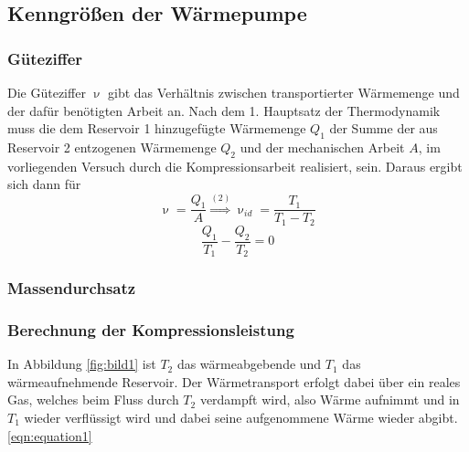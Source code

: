 \subsection{Kenngrößen der Wärmepumpe}
\subsubsection {Güteziffer}
\label{sec:güteziffer}
Die Güteziffer $\upnu$ gibt das Verhältnis zwischen transportierter Wärmemenge und der dafür benötigten Arbeit an. Nach dem 1. Hauptsatz der Thermodynamik muss die dem Reservoir 1 hinzugefügte Wärmemenge $Q_1$
der Summe der aus Reservoir 2 entzogenen Wärmemenge $Q_2$ und der mechanischen Arbeit $A$, im vorliegenden Versuch durch die Kompressionsarbeit realisiert, sein.
Daraus ergibt sich dann für
\begin{equation}
  \label{eqn:equation1}
  \upnu=\frac{Q_1}{A}\stackrel{(2)}{\Rightarrow} \upnu_{id}=\frac{T_1}{T_1-T_2}
\end{equation}
\begin{equation}
  \frac{Q_1}{T_1}-\frac{Q_2}{T_2}=0\label{eqn:equation2}
\end{equation}
\subsubsection {Massendurchsatz}
\label{sec:massendurchsatz}
\subsubsection {Berechnung der Kompressionsleistung}
\label{sec:kompressorleistung}


In Abbildung \ref{fig:bild1} ist $T_2$ das wärmeabgebende und $T_1$ das wärmeaufnehmende Reservoir. Der Wärmetransport erfolgt dabei über ein reales Gas, welches beim Fluss durch $T_2$ verdampft wird, also Wärme aufnimmt
und in $T_1$ wieder verflüssigt wird und dabei seine aufgenommene Wärme wieder abgibt. \eqref{eqn:equation1}







\cite{Anleitung}
